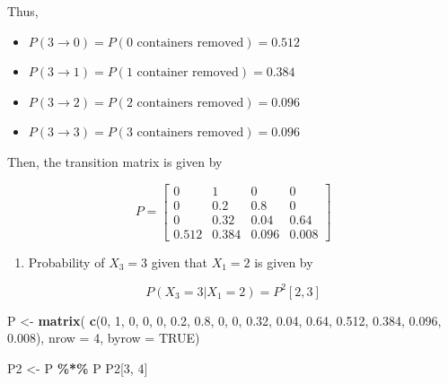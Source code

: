 \documentclass[
]{article}
\newenvironment{Shaded}{\begin{snugshade}}{\end{snugshade}}
\newcommand{\AttributeTok}[1]{\textcolor[rgb]{0.13,0.29,0.53}{#1}}
\newcommand{\ConstantTok}[1]{\textcolor[rgb]{0.56,0.35,0.01}{#1}}
\newcommand{\DecValTok}[1]{\textcolor[rgb]{0.00,0.00,0.81}{#1}}
\newcommand{\FloatTok}[1]{\textcolor[rgb]{0.00,0.00,0.81}{#1}}
\newcommand{\FunctionTok}[1]{\textcolor[rgb]{0.13,0.29,0.53}{\textbf{#1}}}
\newcommand{\NormalTok}[1]{#1}
\newcommand{\OtherTok}[1]{\textcolor[rgb]{0.56,0.35,0.01}{#1}}
\newcommand{\SpecialCharTok}[1]{\textcolor[rgb]{0.81,0.36,0.00}{\textbf{#1}}}
\providecommand{\tightlist}{%
  \setlength{\itemsep}{0pt}\setlength{\parskip}{0pt}}
\begin{document}
Thus,

\begin{itemize}
\item
  \(P(3 \rightarrow 0) = P(0 \text{ containers removed}) = 0.512\)
\item
  \(P(3 \rightarrow 1) = P(1 \text{ container removed}) = 0.384\)
\item
  \(P(3 \rightarrow 2) = P(2 \text{ containers removed}) = 0.096\)
\item
  \(P(3 \rightarrow 3) = P(3 \text{ containers removed}) = 0.096\)
\end{itemize}

Then, the transition matrix is given by

\[P = 
\begin{bmatrix} 
0 & 1 & 0 & 0 \\ 
0 & 0.2 & 0.8 & 0 \\ 
0 & 0.32 & 0.04 & 0.64 \\ 
0.512 & 0.384 & 0.096 & 0.008 
\end{bmatrix}\]

\begin{enumerate}
\def\labelenumi{(\alph{enumi})}
\setcounter{enumi}{1}
\tightlist
\item
  Probability of \(X_3 = 3\) given that \(X_1 = 2\) is given by
\end{enumerate}

\[P(X_3 = 3 | X_1 = 2) = P^2[2,3]\]

\begin{Shaded}
\begin{Highlighting}[]
\NormalTok{P }\OtherTok{\textless{}{-}} \FunctionTok{matrix}\NormalTok{(}
  \FunctionTok{c}\NormalTok{(}\DecValTok{0}\NormalTok{, }\DecValTok{1}\NormalTok{, }\DecValTok{0}\NormalTok{, }\DecValTok{0}\NormalTok{, }
    \DecValTok{0}\NormalTok{, }\FloatTok{0.2}\NormalTok{, }\FloatTok{0.8}\NormalTok{, }\DecValTok{0}\NormalTok{, }
    \DecValTok{0}\NormalTok{, }\FloatTok{0.32}\NormalTok{, }\FloatTok{0.04}\NormalTok{, }\FloatTok{0.64}\NormalTok{, }
    \FloatTok{0.512}\NormalTok{, }\FloatTok{0.384}\NormalTok{, }\FloatTok{0.096}\NormalTok{, }\FloatTok{0.008}\NormalTok{), }\AttributeTok{nrow =} \DecValTok{4}\NormalTok{, }\AttributeTok{byrow =} \ConstantTok{TRUE}\NormalTok{)}

\NormalTok{P2 }\OtherTok{\textless{}{-}}\NormalTok{ P }\SpecialCharTok{\%*\%}\NormalTok{ P}
\NormalTok{P2[}\DecValTok{3}\NormalTok{, }\DecValTok{4}\NormalTok{]}
\end{Highlighting}
\end{Shaded}
\end{document}
